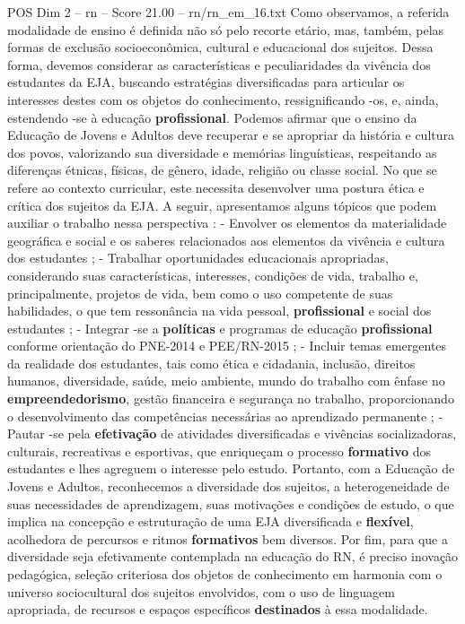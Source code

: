 \begin{textsample}{POS Dim 2 – rn – Score 21.00 – rn/rn\_em\_16.txt}
Como observamos, a referida modalidade de ensino é definida não só pelo recorte etário, mas, também, pelas formas de exclusão socioeconômica, cultural e educacional dos sujeitos.
Dessa forma, devemos considerar as características e peculiaridades da vivência dos estudantes da EJA, buscando estratégias diversificadas para articular os interesses destes com os objetos do conhecimento, ressignificando -os, e, ainda, estendendo -se à educação \textbf{profissional}.
Podemos afirmar que o ensino da Educação de Jovens e Adultos deve recuperar e se apropriar da história e cultura dos povos, valorizando sua diversidade e memórias linguísticas, respeitando as diferenças étnicas, físicas, de gênero, idade, religião ou classe social.
No que se refere ao contexto curricular, este necessita desenvolver uma postura ética e crítica dos sujeitos da EJA.
A seguir, apresentamos alguns tópicos que podem auxiliar o trabalho nessa perspectiva : - Envolver os elementos da materialidade geográfica e social e os saberes relacionados aos elementos da vivência e cultura dos estudantes ; - Trabalhar oportunidades educacionais apropriadas, considerando suas características, interesses, condições de vida, trabalho e, principalmente, projetos de vida, bem como o uso competente de suas habilidades, o que tem ressonância na vida pessoal, \textbf{profissional} e social dos estudantes ; - Integrar -se a \textbf{políticas} e programas de educação \textbf{profissional} conforme orientação do PNE-2014 e PEE/RN-2015 ; - Incluir temas emergentes da realidade dos estudantes, tais como ética e cidadania, inclusão, direitos humanos, diversidade, saúde, meio ambiente, mundo do trabalho com ênfase no \textbf{empreendedorismo}, gestão financeira e segurança no trabalho, proporcionando o desenvolvimento das competências necessárias ao aprendizado permanente ; - Pautar -se pela \textbf{efetivação} de atividades diversificadas e vivências socializadoras, culturais, recreativas e esportivas, que enriqueçam o processo \textbf{formativo} dos estudantes e lhes agreguem o interesse pelo estudo.
Portanto, com a Educação de Jovens e Adultos, reconhecemos a diversidade dos sujeitos, a heterogeneidade de suas necessidades de aprendizagem, suas motivações e condições de estudo, o que implica na concepção e estruturação de uma EJA diversificada e \textbf{flexível}, acolhedora de percursos e ritmos \textbf{formativos} bem diversos.
Por fim, para que a diversidade seja efetivamente contemplada na educação do RN, é preciso inovação pedagógica, seleção criteriosa dos objetos de conhecimento em harmonia com o universo sociocultural dos sujeitos envolvidos, com o uso de linguagem apropriada, de recursos e espaços específicos \textbf{destinados} à essa modalidade.

\end{textsample}
